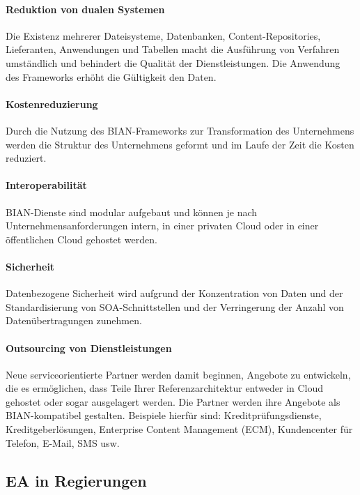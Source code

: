 \documentclass[
	doc,
	a4paper,
	helv
	]{apa6}
\begin{document}
\paragraph{Reduktion von dualen Systemen}
Die Existenz mehrerer Dateisysteme, Datenbanken, Content-Repositories, Lieferanten, Anwendungen und Tabellen macht die Ausführung von Verfahren umständlich und behindert die Qualität der Dienstleistungen. Die Anwendung des Frameworks erhöht die Gültigkeit den Daten.
\paragraph{Kostenreduzierung}
Durch die Nutzung des BIAN-Frameworks zur Transformation des Unternehmens werden die Struktur des Unternehmens geformt und im Laufe der Zeit die Kosten reduziert.
\paragraph{Interoperabilität}	
BIAN-Dienste sind modular aufgebaut und können je nach Unternehmensanforderungen intern, in einer privaten Cloud oder in einer öffentlichen Cloud gehostet werden.
\paragraph{Sicherheit}
Datenbezogene Sicherheit wird aufgrund der Konzentration von Daten und der Standardisierung von SOA-Schnittstellen und der Verringerung der Anzahl von Datenübertragungen zunehmen.
\paragraph{Outsourcing von Dienstleistungen}
Neue serviceorientierte Partner werden damit beginnen, Angebote zu entwickeln, die es ermöglichen, dass Teile Ihrer Referenzarchitektur entweder in Cloud gehostet oder sogar ausgelagert werden. Die Partner werden ihre Angebote als BIAN-kompatibel gestalten. Beispiele hierfür sind: Kreditprüfungsdienste, 
Kreditgeberlösungen, Enterprise Content Management (ECM), Kundencenter für Telefon, E-Mail, SMS usw.

\subsection{EA in Regierungen}
\end{document}
